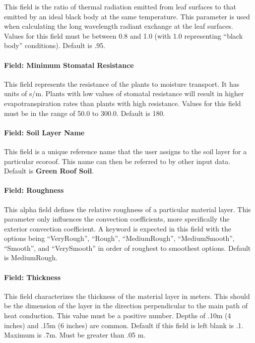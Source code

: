 This field is the ratio of thermal radiation emitted from leaf surfaces to that emitted by an ideal black body at the same temperature. This parameter is used when calculating the long wavelength radiant exchange at the leaf surfaces. Values for this field must be between 0.8 and 1.0 (with 1.0 representing ``black body'' conditions). Default is .95.

\paragraph{Field: Minimum Stomatal Resistance}\label{field-minimum-stomatal-resistance}

This field represents the resistance of the plants to moisture transport. It has units of s/m. Plants with low values of stomatal resistance will result in higher evapotranspiration rates than plants with high resistance. Values for this field must be in the range of 50.0 to 300.0. Default is 180.

\paragraph{Field: Soil Layer Name}\label{field-soil-layer-name}

This field is a unique reference name that the user assigns to the soil layer for a particular ecoroof. This name can then be referred to by other input data. Default is \textbf{Green Roof Soil}.

\paragraph{Field: Roughness}\label{field-roughness-2}

This alpha field defines the relative roughness of a particular material layer. This parameter only influences the convection coefficients, more specifically the exterior convection coefficient. A keyword is expected in this field with the options being ``VeryRough'', ``Rough'', ``MediumRough'', ``MediumSmooth'', ``Smooth'', and ``VerySmooth'' in order of roughest to smoothest options. Default is MediumRough.

\paragraph{Field: Thickness}\label{field-thickness-9}

This field characterizes the thickness of the material layer in meters. This should be the dimension of the layer in the direction perpendicular to the main path of heat conduction. This value must be a positive number. Depths of .10m (4 inches) and .15m (6 inches) are common. Default if this field is left blank is .1. Maximum is .7m. Must be greater than .05 m.


